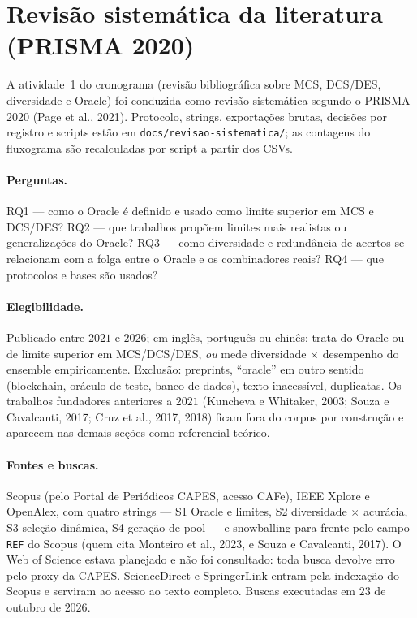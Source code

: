 \section{Revisão sistemática da literatura (PRISMA 2020)}
\label{sec:revisao}

A atividade~1 do cronograma (revisão bibliográfica sobre MCS, DCS/DES,
diversidade e Oracle) foi conduzida como revisão sistemática segundo o PRISMA
2020 (Page et al., 2021). Protocolo, strings, exportações brutas, decisões por
registro e scripts estão em \texttt{docs/revisao-sistematica/}; as contagens do
fluxograma são recalculadas por script a partir dos CSVs.

\paragraph{Perguntas.} RQ1 --- como o Oracle é definido e usado como limite
superior em MCS e DCS/DES? RQ2 --- que trabalhos propõem limites mais realistas
ou generalizações do Oracle? RQ3 --- como diversidade e redundância de acertos se
relacionam com a folga entre o Oracle e os combinadores reais? RQ4 --- que
protocolos e bases são usados?

\paragraph{Elegibilidade.} Publicado entre $2021$ e $2026$; em inglês, português
ou chinês; trata do Oracle ou de limite superior em MCS/DCS/DES, \emph{ou} mede
diversidade $\times$ desempenho do ensemble empiricamente. Exclusão: preprints,
``oracle'' em outro sentido (blockchain, oráculo de teste, banco de dados),
texto inacessível, duplicatas. Os trabalhos fundadores anteriores a $2021$
(Kuncheva e Whitaker, 2003; Souza e Cavalcanti, 2017; Cruz et al., 2017, 2018)
ficam fora do corpus por construção e aparecem nas demais seções como
referencial teórico.

\paragraph{Fontes e buscas.} Scopus (pelo Portal de Periódicos CAPES, acesso
CAFe), IEEE Xplore e OpenAlex, com quatro strings --- S1 Oracle e limites, S2
diversidade $\times$ acurácia, S3 seleção dinâmica, S4 geração de pool --- e
snowballing para frente pelo campo \texttt{REF} do Scopus (quem cita Monteiro et
al., 2023, e Souza e Cavalcanti, 2017). O Web of Science estava planejado e não
foi consultado: toda busca devolve erro pelo proxy da CAPES. ScienceDirect e
SpringerLink entram pela indexação do Scopus e serviram ao acesso ao texto
completo. Buscas executadas em $23$ de outubro de $2026$.

